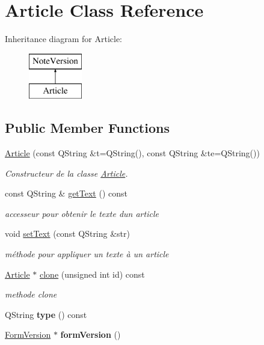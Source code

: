 \hypertarget{class_article}{}\section{Article Class Reference}
\label{class_article}
Inheritance diagram for Article\+:\begin{figure}[H]
\begin{center}
\leavevmode
\includegraphics[height=2.000000cm]{class_article}
\end{center}
\end{figure}
\subsection*{Public Member Functions}
\begin{DoxyCompactItemize}
\item 
\hyperlink{class_article_a972ec00d52c495a57f8c657b96280327}{Article} (const Q\+String \&t=Q\+String(), const Q\+String \&te=Q\+String())
\begin{DoxyCompactList}\small\item\em Constructeur de la classe \hyperlink{class_article}{Article}. \end{DoxyCompactList}\item 
\mbox{\label{class_article_a66368afb3591b3b4427317e054dd21c7}} 
const Q\+String \& \hyperlink{class_article_a66368afb3591b3b4427317e054dd21c7}{get\+Text} () const
\begin{DoxyCompactList}\small\item\em accesseur pour obtenir le texte d\textquotesingle{}un article \end{DoxyCompactList}\item 
void \hyperlink{class_article_aaff3219cf9a04413349ff091f1674a26}{set\+Text} (const Q\+String \&str)
\begin{DoxyCompactList}\small\item\em méthode pour appliquer un texte à un article \end{DoxyCompactList}\item 
\hyperlink{class_article}{Article} $\ast$ \hyperlink{class_article_a78188a4d3c5b071caf13db46ecdc32b9}{clone} (unsigned int id) const
\begin{DoxyCompactList}\small\item\em methode clone \end{DoxyCompactList}\item 
\mbox{\label{class_article_a85b13c2eb79223ce0c86fa2a82529c60}} 
Q\+String {\bfseries type} () const
\item 
\mbox{\label{class_article_a160945b868825fde17945453e9a70787}} 
\hyperlink{class_form_version}{Form\+Version} $\ast$ {\bfseries form\+Version} ()
\end{DoxyCompactItemize}
